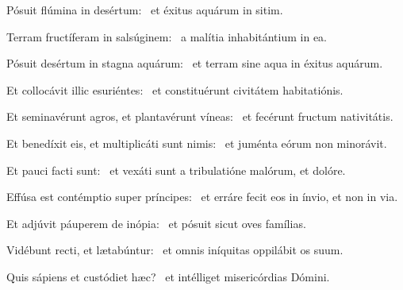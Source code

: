 \item Pósuit flúmina in desértum:~\psstar{} et éxitus aquárum in sitim.

\item Terram fructíferam in salsúginem:~\psstar{} a malítia inhabitántium in ea.

\item Pósuit desértum in stagna aquárum:~\psstar{} et terram sine aqua in éxitus aquárum.

\item Et collocávit illic esuriéntes:~\psstar{} et constituérunt civitátem habitatiónis.

\item Et seminavérunt agros, et plantavérunt víneas:~\psstar{} et fecérunt fructum nativitátis.

\item Et benedíxit eis, et multiplicáti sunt nimis:~\psstar{} et juménta eórum non minorávit.

\item Et pauci facti sunt:~\psstar{} et vexáti sunt a tribulatióne malórum, et dolóre.

\item Effúsa est contémptio super príncipes:~\psstar{} et erráre fecit eos in ínvio, et non in via.

\item Et adjúvit páuperem de inópia:~\psstar{} et pósuit sicut oves famílias.

\item Vidébunt recti, et lætabúntur:~\psstar{} et omnis iníquitas oppilábit os suum.

\item Quis sápiens et custódiet hæc?~\psstar{} et intélliget misericórdias Dómini.